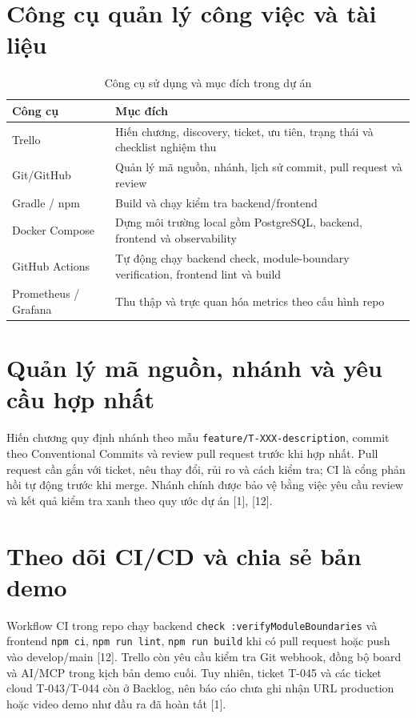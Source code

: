 \documentclass[12pt,a4paper]{report}
\begin{document}
\section{Công cụ quản lý công việc và tài liệu}
\begin{table}[H]
\centering
\caption{Công cụ sử dụng và mục đích trong dự án}
\begin{tabularx}{\textwidth}{|l|X|}
\hline
\textbf{Công cụ} & \textbf{Mục đích} \\
\hline
Trello & Hiến chương, discovery, ticket, ưu tiên, trạng thái và checklist nghiệm thu \\
Git/GitHub & Quản lý mã nguồn, nhánh, lịch sử commit, pull request và review \\
Gradle / npm & Build và chạy kiểm tra backend/frontend \\
Docker Compose & Dựng môi trường local gồm PostgreSQL, backend, frontend và observability \\
GitHub Actions & Tự động chạy backend check, module-boundary verification, frontend lint và build \\
Prometheus / Grafana & Thu thập và trực quan hóa metrics theo cấu hình repo \\
\hline
\end{tabularx}
\end{table}

\section{Quản lý mã nguồn, nhánh và yêu cầu hợp nhất}
Hiến chương quy định nhánh theo mẫu \texttt{feature/T-XXX-description}, commit theo Conventional Commits và review pull request trước khi hợp nhất. Pull request cần gắn với ticket, nêu thay đổi, rủi ro và cách kiểm tra; CI là cổng phản hồi tự động trước khi merge. Nhánh chính được bảo vệ bằng việc yêu cầu review và kết quả kiểm tra xanh theo quy ước dự án [1], [12].

\section{Theo dõi CI/CD và chia sẻ bản demo}
Workflow CI trong repo chạy backend \texttt{check :verifyModuleBoundaries} và frontend \texttt{npm ci}, \texttt{npm run lint}, \texttt{npm run build} khi có pull request hoặc push vào develop/main [12]. Trello còn yêu cầu kiểm tra Git webhook, đồng bộ board và AI/MCP trong kịch bản demo cuối. Tuy nhiên, ticket T-045 và các ticket cloud T-043/T-044 còn ở Backlog, nên báo cáo chưa ghi nhận URL production hoặc video demo như đầu ra đã hoàn tất [1].
\end{document}
